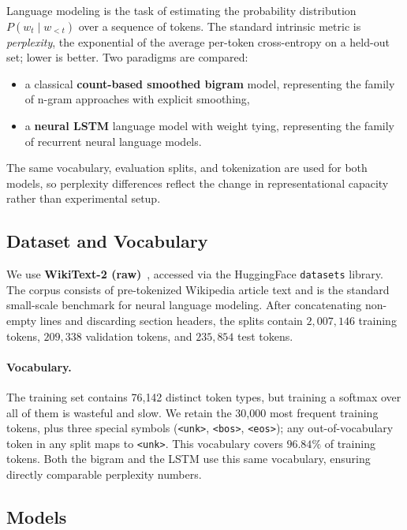 \documentclass[11pt,a4paper]{article}
\begin{document}
Language modeling is the task of estimating the probability distribution
$P(w_t \mid w_{<t})$ over a sequence of tokens. The standard intrinsic
metric is \emph{perplexity}, the exponential of the average per-token
cross-entropy on a held-out set; lower is better. Two paradigms are
compared:
\begin{itemize}[noitemsep]
    \item a classical \textbf{count-based smoothed bigram} model, representing
          the family of n-gram approaches with explicit smoothing,
    \item a \textbf{neural LSTM} language model with weight tying, representing
          the family of recurrent neural language models.
\end{itemize}
The same vocabulary, evaluation splits, and tokenization are used for
both models, so perplexity differences reflect the change in
representational capacity rather than experimental setup.

\subsection{Dataset and Vocabulary}

We use \textbf{WikiText-2 (raw)}~\cite{merity2017wikitext}, accessed via the
HuggingFace \texttt{datasets} library. The corpus consists of pre-tokenized
Wikipedia article text and is the standard small-scale benchmark for
neural language modeling. After concatenating non-empty lines and
discarding section headers, the splits contain
$2{,}007{,}146$ training tokens, $209{,}338$ validation tokens, and
$235{,}854$ test tokens.

\paragraph{Vocabulary.} The training set contains 76{,}142 distinct token
types, but training a softmax over all of them is wasteful and slow.
We retain the 30{,}000 most frequent training tokens, plus three
special symbols (\texttt{<unk>}, \texttt{<bos>}, \texttt{<eos>}); any
out-of-vocabulary token in any split maps to \texttt{<unk>}. This
vocabulary covers $96.84\%$ of training tokens. Both the bigram and the
LSTM use this same vocabulary, ensuring directly comparable perplexity
numbers.

\subsection{Models}
\end{document}
